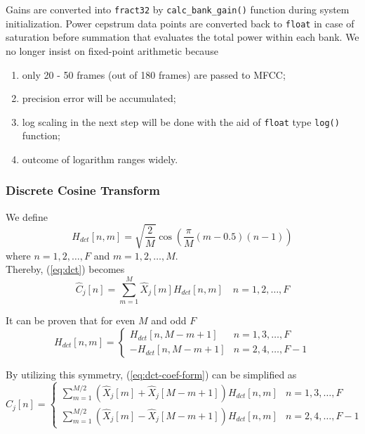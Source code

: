 Gains are converted into \texttt{fract32} by \texttt{calc\_bank\_gain()} function during system initialization. Power cepstrum data points are converted back to \texttt{float} in case of saturation before summation that evaluates the total power within each bank. We no longer insist on fixed-point arithmetic because
\begin{enumerate}
\item only 20 - 50 frames (out of 180 frames) are passed to MFCC;
\item precision error will be accumulated;
\item log scaling in the next step will be done with the aid of \texttt{float} type \texttt{log()} function;
\item outcome of logarithm ranges widely.
\end{enumerate}


\subsubsection{Discrete Cosine Transform}

We define
\begin{equation}
\label{eq:dct-coef}
H_{dct}[n, m] = \sqrt{\frac{2}{M}} \cos \left( \frac{\pi}{M} (m - 0.5) (n-1) \right)
\end{equation}
where $n = 1, 2, \dots, F$ and $m = 1, 2, \dots, M$.\\

Thereby, (\ref{eq:dct}) becomes
\begin{equation}
\label{eq:dct-coef-form}
\hat{C}_j[n] = \sum^{M}_{m=1} \hat{X}_j[m] H_{dct}[n, m] \quad n = 1, 2, \dots, F
\end{equation}

It can be proven that for even $M$ and odd $F$
\begin{equation}
H_{dct}[n, m] =
\begin{cases}
H_{dct}[n, M-m+1] & n = 1, 3, \dots, F\\
-H_{dct}[n, M-m+1] & n = 2, 4, \dots, F-1
\end{cases}
\end{equation}

By utilizing this symmetry, (\ref{eq:dct-coef-form}) can be simplified as
\begin{equation}
\label{eq:dct-symmetric-form}
\hat{C}_j[n] = 
\begin{cases}
\displaystyle\sum^{M/2}_{m=1} (\hat{X}_j[m] + \hat{X}_j[M-m+1]) H_{dct}[n, m] & n = 1, 3, \dots, F\\
\displaystyle\sum^{M/2}_{m=1} (\hat{X}_j[m] - \hat{X}_j[M-m+1]) H_{dct}[n, m] & n = 2, 4, \dots, F-1
\end{cases}
\end{equation}

